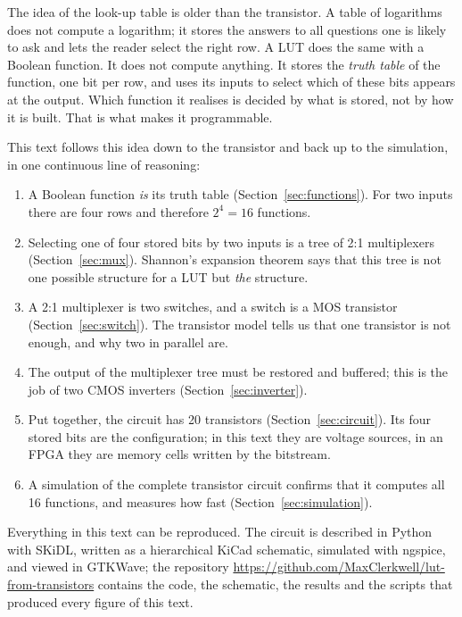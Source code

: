 \documentclass[11pt,a4paper]{article}
\begin{document}
The idea of the look-up table is older than the transistor. A table of
logarithms does not compute a logarithm; it stores the answers to all
questions one is likely to ask and lets the reader select the right row.
A LUT does the same with a Boolean function. It does not compute
anything. It stores the \emph{truth table} of the function, one bit per
row, and uses its inputs to select which of these bits appears at the
output. Which function it realises is decided by what is stored, not by
how it is built. That is what makes it programmable.

This text follows this idea down to the transistor and back up to the
simulation, in one continuous line of reasoning:

\begin{enumerate}
    \item A Boolean function \emph{is} its truth table
          (Section~\ref{sec:functions}). For two inputs there are four
          rows and therefore $2^4=16$ functions.
    \item Selecting one of four stored bits by two inputs is a tree of
          2:1 multiplexers (Section~\ref{sec:mux}). Shannon's expansion
          theorem says that this tree is not one possible structure for a
          LUT but \emph{the} structure.
    \item A 2:1 multiplexer is two switches, and a switch is a MOS
          transistor (Section~\ref{sec:switch}). The transistor model
          tells us that one transistor is not enough, and why two in
          parallel are.
    \item The output of the multiplexer tree must be restored and
          buffered; this is the job of two CMOS inverters
          (Section~\ref{sec:inverter}).
    \item Put together, the circuit has 20 transistors
          (Section~\ref{sec:circuit}). Its four stored bits are the
          configuration; in this text they are voltage sources, in an
          FPGA they are memory cells written by the bitstream.
    \item A simulation of the complete transistor circuit confirms that
          it computes all 16 functions, and measures how fast
          (Section~\ref{sec:simulation}).
\end{enumerate}

Everything in this text can be reproduced. The circuit is described in
Python with SKiDL, written as a hierarchical KiCad schematic, simulated
with ngspice, and viewed in GTKWave; the repository
\url{https://github.com/MaxClerkwell/lut-from-transistors} contains the code,
the schematic, the results and the scripts that produced every figure
of this text.
\end{document}
